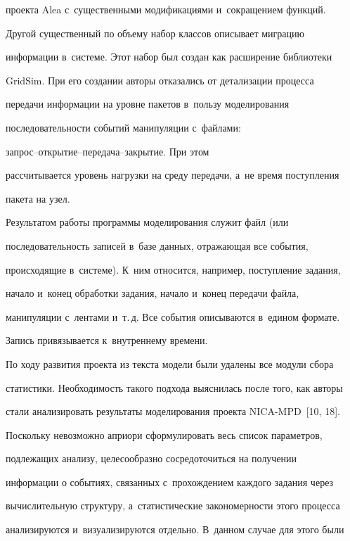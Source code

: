 проекта Alea с~существенными модификациями и~сокращением функций.





  Другой существенный по объему набор классов описывает миграцию


информации в~системе. Этот набор был создан как расширение библиотеки


GridSim. При его создании авторы отказались от детализации процесса


передачи информации на уровне пакетов в~пользу моделирования


последовательности событий манипуляции с~файлами:


  за\-прос--откры\-тие--пе\-ре\-да\-ча--за\-кры\-тие. При этом


рассчитывается уровень нагрузки на среду передачи, а~не время поступления


пакета на узел.





  Результатом работы программы моделирования служит файл (или


последовательность записей в~базе данных, отражающая все события,


происходящие в~системе). К~ним относится, например, поступление задания,


начало и~конец обработки задания, начало и~конец передачи файла,


манипуляции с~лентами и~т.\,д. Все события описываются в~едином формате.


Запись привязывается к~внутреннему времени.





  По ходу развития проекта из текста модели были удалены все модули сбора


статистики. Необходимость такого подхода выяснилась после того, как авторы


стали анализировать результаты моделирования проекта NICA-MPD~[10, 18].


Поскольку невозможно априори сформулировать весь список параметров,


подлежащих анализу, целесообразно сосредоточиться на получении


информации о событиях, связанных с~прохождением каждого задания через


вычислительную структуру, а~статистические закономерности этого процесса


анализируются и~визуализируются отдельно. В~данном случае для этого были


